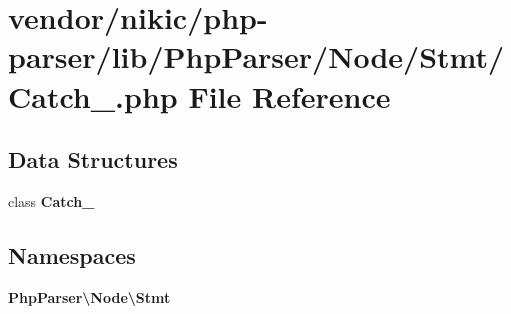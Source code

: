 \section{vendor/nikic/php-\/parser/lib/\+Php\+Parser/\+Node/\+Stmt/\+Catch\+\_\+.php File Reference}
\label{_catch___8php}
\subsection*{Data Structures}
\begin{DoxyCompactItemize}
\item 
class {\bf Catch\+\_\+}
\end{DoxyCompactItemize}
\subsection*{Namespaces}
\begin{DoxyCompactItemize}
\item 
 {\bf Php\+Parser\textbackslash{}\+Node\textbackslash{}\+Stmt}
\end{DoxyCompactItemize}
